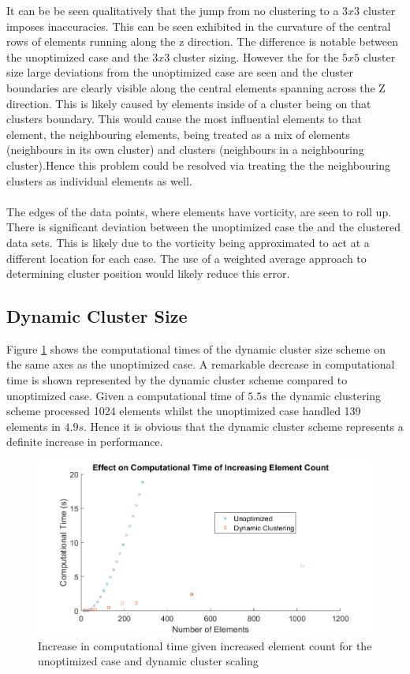 It can be be seen qualitatively that the jump from no clustering to a $3x3$ cluster imposes inaccuracies. This can be seen exhibited in the curvature of the central rows of elements running along the z direction. The difference is notable between the unoptimized case and the $3x3$ cluster sizing. However the for the $5x5$ cluster size large deviations from the unoptimized case are seen and the cluster boundaries are clearly visible along the central elements spanning across the Z direction. This is likely caused by elements inside of a cluster being on that clusters boundary. This would cause the most influential elements to that element, the neighbouring elements, being treated as a mix of elements (neighbours in its own cluster) and clusters (neighbours in a neighbouring cluster).Hence this problem could be resolved via treating the the neighbouring clusters as individual elements as well.
\\\\
The edges of the data points, where elements have vorticity, are seen to roll up. There is significant deviation between the unoptimized case the and the clustered data sets. This is likely due to the vorticity being approximated to act at a different location for each case. The use of a weighted average approach to determining cluster position would likely reduce this error.
\subsection{Dynamic Cluster Size}
Figure \ref{fig:DynamicClusterTimes} shows the computational times of the dynamic cluster size scheme on the same axes as the unoptimized case. A remarkable decrease in computational time is shown represented by the dynamic cluster scheme compared to unoptimized case. Given a computational time of $5.5s$ the dynamic clustering scheme processed 1024 elements whilst the unoptimized case handled 139 elements in $4.9s$. Hence it is obvious that the dynamic cluster scheme represents a definite increase in performance.

\begin{figure}[H]
\centering
\includegraphics[width=1.0\textwidth]{Figures/DynamicClusterSize.png}
\caption{\label{fig:DynamicClusterTimes} Increase in computational time given increased element count for the unoptimized case and dynamic cluster scaling}
\end{figure} 

